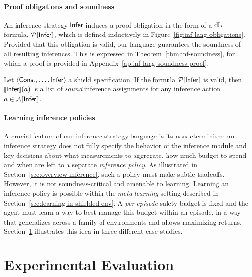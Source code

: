 \documentclass[acmsmall,screen,nonacm]{acmart}
\begin{document}


\paragraph{Proof obligations and soundness}
An inference strategy $\mathsf{Infer}$ induces a proof obligation in the form of a $\mathop{}\!\mathrm{d} \text{L}$ formula, $\ProofSem{\Inference}$, which is defined inductively in Figure~\ref{fig:inf-lang-obligations}. Provided that this obligation is valid, our language guarantees the soundness of all resulting inferences. This is expressed in Theorem~\ref{thm:inf-soundness}, for which a proof is provided in Appendix~\ref{ap:inf-lang-soundness-proof}.




\begin{theorem}\label{thm:inf-soundness}
  Let $\left\langle\mathsf{Const},\dots,\mathsf{Infer}\right\rangle$ a shield specification. If the formula $\ProofSem{\Inference}$ is valid, then $\sem{\Inference}(a)$ is a list of \emph{sound} inference assignments for any inference action $a \in \InfActionSem{\Inference}$.
\end{theorem}


\paragraph{Learning inference policies} A crucial feature of our inference strategy language is its nondeterminism: an inference strategy does not fully specify the behavior of the inference module and key decisions about what measurements to aggregate, how much budget to spend and when are left to a separate \emph{inference policy}. As illustrated in Section~\ref{sec:overview-inference}, such a policy must make subtle tradeoffs. However, it is not soundness-critical and amenable to learning. Learning an inference policy is possible within the \emph{meta-learning} setting described in Section~\ref{sec:learning-in-shielded-env}. A \emph{per-episode} safety-budget is fixed and the agent must learn a way to best manage this budget within an episode, in a way that generalizes across a family of environments and allows maximizing returns. Section~\ref{sec:experiments} illustrates this idea in three different case studies.

\section{Experimental Evaluation}\label{sec:experiments}
\end{document}
